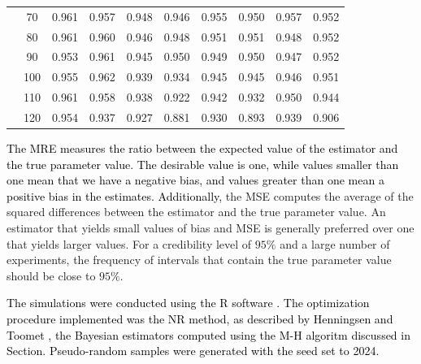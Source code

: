 \documentclass[]{interact}
\theoremstyle{plain}%
\theoremstyle{definition}
\theoremstyle{remark}
\begin{document}
\begin{table}[!h]
\begin{tabular}{c|c|c|c|c|c|c|c|c|c}
&  70 & 0.961 & 0.957 & 0.948 & 0.946 & 0.955 & 0.950 & 0.957 & 0.952 \\
&  80 & 0.961 & 0.960 & 0.946 & 0.948 & 0.951 & 0.951 & 0.948 & 0.952 \\
&  90 & 0.953 & 0.961 & 0.945 & 0.950 & 0.949 & 0.950 & 0.947 & 0.952 \\
&  100 & 0.955 & 0.962 & 0.939 & 0.934 & 0.945 & 0.945 & 0.946 & 0.951 \\
&  110 & 0.961 & 0.958 & 0.938 & 0.922 & 0.942 & 0.932 & 0.950 & 0.944 \\
&  120 & 0.954 & 0.937 & 0.927 & 0.881 & 0.930 & 0.893 & 0.939 & 0.906 \\ \hline
\hline
\end{tabular}
\label{tableres3}
\end{table}

\textcolor{black}{The MRE measures the ratio between the expected value of the estimator and the true parameter value. The desirable value is one, while values smaller than one mean that we have a negative bias, and values greater than one mean a positive bias in the estimates. Additionally,} the MSE computes the average of the squared differences between the estimator and the true parameter value. An estimator that yields small values of bias and MSE is generally preferred over one that yields larger values. For a credibility level of $95\%$ and a large number of experiments, the frequency of intervals that contain the true parameter value should be close to $95\%$.

\textcolor{black}{The simulations were conducted using the R software \cite{rsoftware20024}. The optimization procedure implemented was the NR method, as described by Henningsen and Toomet \cite{henningsen2011maxlik}, the Bayesian estimators computed using the M-H algoritm discussed in Section. Pseudo-random samples were generated with the seed set to 2024.}
\end{document}
